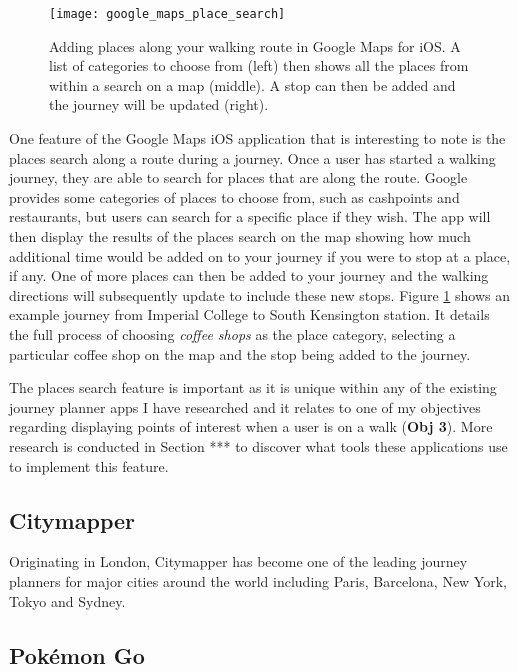 
\begin{figure}[hbt]
  \centering
  \texttt{[image: google\_maps\_place\_search]}
  \caption{Adding places along your walking route in Google Maps for iOS. A list of categories to choose from (left) then shows all the places from within a search on a map (middle). A stop can then be added and the journey will be updated (right).}
  \label{fig:google_maps_place_search}
\end{figure}


One feature of the Google Maps iOS application that is interesting to note is the places search along a route during a journey. Once a user has started a walking journey, they are able to search for places that are along the route. Google provides some categories of places to choose from, such as cashpoints and restaurants, but users can search for a specific place if they wish. The app will then display the results of the places search on the map showing how much additional time would be added on to your journey if you were to stop at a place, if any. One of more places can then be added to your journey and the walking directions will subsequently update to include these new stops. Figure \ref{fig:google_maps_place_search} shows an example journey from Imperial College to South Kensington station. It details the full process of choosing \textit{coffee shops} as the place category, selecting a particular coffee shop on the map and the stop being added to the journey.

The places search feature is important as it is unique within any of the existing journey planner apps I have researched and it relates to one of my objectives regarding displaying points of interest when a user is on a walk (\textbf{Obj 3}). More research is conducted in Section *** to discover what tools these applications use to implement this feature.

\subsection{Citymapper}

Originating in London, Citymapper \cite{Citymapper} has become one of the leading journey planners for major cities around the world including Paris, Barcelona, New York, Tokyo and Sydney. 

\subsection{Pok\'{e}mon Go}

